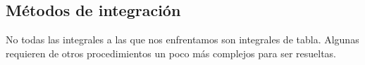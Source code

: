 \documentclass[10pt,twoside]{SelfArx} %
\begin{document}
\subsection{Métodos de integración}
No todas las integrales a las que nos enfrentamos son integrales de tabla. Algunas requieren de otros procedimientos un poco más complejos para ser resueltas.





\end{document}
